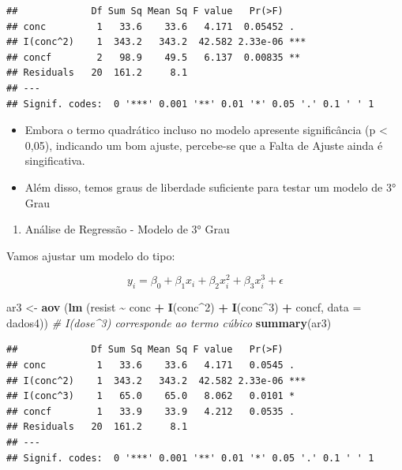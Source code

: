 \documentclass[
]{book}
\newenvironment{Shaded}{\begin{snugshade}}{\end{snugshade}}
\newcommand{\AttributeTok}[1]{\textcolor[rgb]{0.13,0.29,0.53}{#1}}
\newcommand{\CommentTok}[1]{\textcolor[rgb]{0.56,0.35,0.01}{\textit{#1}}}
\newcommand{\DecValTok}[1]{\textcolor[rgb]{0.00,0.00,0.81}{#1}}
\newcommand{\FunctionTok}[1]{\textcolor[rgb]{0.13,0.29,0.53}{\textbf{#1}}}
\newcommand{\NormalTok}[1]{#1}
\newcommand{\OtherTok}[1]{\textcolor[rgb]{0.56,0.35,0.01}{#1}}
\newcommand{\SpecialCharTok}[1]{\textcolor[rgb]{0.81,0.36,0.00}{\textbf{#1}}}
\providecommand{\tightlist}{%
  \setlength{\itemsep}{0pt}\setlength{\parskip}{0pt}}
\begin{document}
\begin{verbatim}
##             Df Sum Sq Mean Sq F value   Pr(>F)    
## conc         1   33.6    33.6   4.171  0.05452 .  
## I(conc^2)    1  343.2   343.2  42.582 2.33e-06 ***
## concf        2   98.9    49.5   6.137  0.00835 ** 
## Residuals   20  161.2     8.1                     
## ---
## Signif. codes:  0 '***' 0.001 '**' 0.01 '*' 0.05 '.' 0.1 ' ' 1
\end{verbatim}

\begin{itemize}
\tightlist
\item
  Embora o termo quadrático incluso no modelo apresente significância (p \textless{} 0,05), indicando um bom ajuste, percebe-se que a Falta de Ajuste ainda é singificativa.
\item
  Além disso, temos graus de liberdade suficiente para testar um modelo de 3° Grau
\end{itemize}

\begin{enumerate}
\def\labelenumi{\arabic{enumi}.}
\setcounter{enumi}{5}
\tightlist
\item
  Análise de Regressão - Modelo de 3° Grau
\end{enumerate}

Vamos ajustar um modelo do tipo:

\[y_{i}=\beta _{0}+\beta _{1}x_{i}+\beta _{2}x_{i}^2+\beta _{3}x_{i}^3+\epsilon\]

\begin{Shaded}
\begin{Highlighting}[]
\NormalTok{ar3 }\OtherTok{\textless{}{-}} \FunctionTok{aov}\NormalTok{ (}\FunctionTok{lm}\NormalTok{ (resist }\SpecialCharTok{\textasciitilde{}}\NormalTok{ conc }\SpecialCharTok{+} \FunctionTok{I}\NormalTok{(conc}\SpecialCharTok{\^{}}\DecValTok{2}\NormalTok{) }\SpecialCharTok{+} \FunctionTok{I}\NormalTok{(conc}\SpecialCharTok{\^{}}\DecValTok{3}\NormalTok{) }\SpecialCharTok{+}\NormalTok{ concf, }\AttributeTok{data =}\NormalTok{ dados4)) }\CommentTok{\# I(dose\^{}3) corresponde ao termo cúbico}
\FunctionTok{summary}\NormalTok{(ar3)}
\end{Highlighting}
\end{Shaded}

\begin{verbatim}
##             Df Sum Sq Mean Sq F value   Pr(>F)    
## conc         1   33.6    33.6   4.171   0.0545 .  
## I(conc^2)    1  343.2   343.2  42.582 2.33e-06 ***
## I(conc^3)    1   65.0    65.0   8.062   0.0101 *  
## concf        1   33.9    33.9   4.212   0.0535 .  
## Residuals   20  161.2     8.1                     
## ---
## Signif. codes:  0 '***' 0.001 '**' 0.01 '*' 0.05 '.' 0.1 ' ' 1
\end{verbatim}
\end{document}
